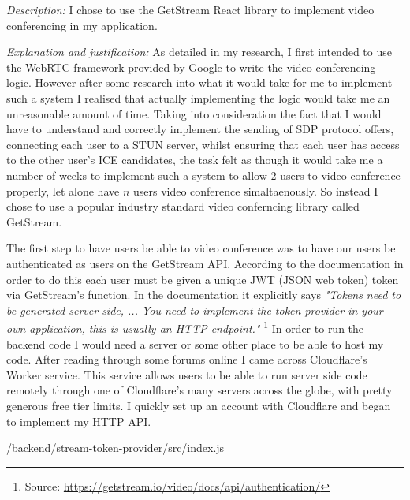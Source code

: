 \textit{Description:} I chose to use the GetStream React
library to implement video conferencing in my application. \\
\vspace{0.2cm}

\textit{Explanation and justification:} As detailed in my research, I first
intended to use the WebRTC framework provided by Google to
write the video conferencing logic. However after some research
into what it would take for me to implement such a system I
realised that actually implementing the logic would take me
an unreasonable amount of time. Taking into consideration the
fact that I would have to understand and correctly implement
the sending of SDP protocol offers, connecting each user to a
STUN server, whilst ensuring that each user has access to
the other user's ICE candidates, the task felt as though it
would take me a number of weeks to implement such a system
to allow 2 users to video conference properly, let alone have
$n$ users video conference simaltaenously. So instead I chose
to use a popular industry standard video conferncing library
called GetStream. \\ \vspace{0.2cm}

The first step to have users be able to
video conference was to have our users be authenticated as
users on the GetStream API. According to the documentation
in order to do this each user must be given a unique JWT
(JSON web token) token via GetStream's
 function. In the documentation
it explicitly says \textit{"Tokens need to be generated server-side,
... You need to implement the token provider in your own application,
this is usually an HTTP endpoint."} \footnote{Source:
\url{https://getstream.io/video/docs/api/authentication/}}
In order to run the backend code I would need a server or some
other place to be able to host my code. After reading through
some forums online I came across Cloudflare's Worker service.
This service allows users to be able to run server side code
remotely through one of Cloudflare's many servers across the globe,
with pretty generous free tier limits. I quickly set up an account
with Cloudflare and began to implement my HTTP API. \\ \vspace{0.2cm}

\underline{/backend/stream-token-provider/src/index.js} \\

